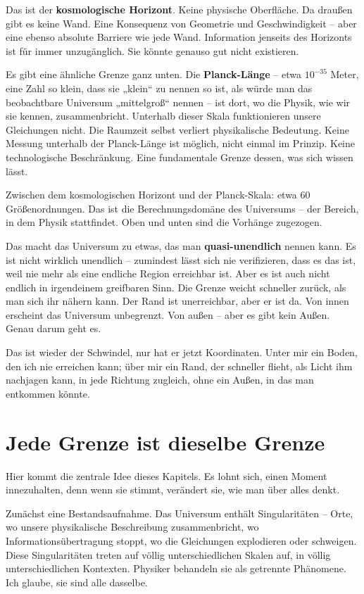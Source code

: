 \documentclass[11pt, twoside, openright]{book}
\begin{document}
Das ist der \textbf{kosmologische Horizont}. Keine physische Oberfläche. Da draußen gibt es keine Wand. Eine Konsequenz von Geometrie und Geschwindigkeit -- aber eine ebenso absolute Barriere wie jede Wand. Information jenseits des Horizonts ist für immer unzugänglich. Sie könnte genauso gut nicht existieren.

Es gibt eine ähnliche Grenze ganz unten. Die \textbf{Planck-Länge} -- etwa $10^{-35}$ Meter, eine Zahl so klein, dass sie „klein“ zu nennen so ist, als würde man das beobachtbare Universum „mittelgroß“ nennen -- ist dort, wo die Physik, wie wir sie kennen, zusammenbricht. Unterhalb dieser Skala funktionieren unsere Gleichungen nicht. Die Raumzeit selbst verliert physikalische Bedeutung. Keine Messung unterhalb der Planck-Länge ist möglich, nicht einmal im Prinzip. Keine technologische Beschränkung. Eine fundamentale Grenze dessen, was sich wissen lässt.

Zwischen dem kosmologischen Horizont und der Planck-Skala: etwa 60 Größenordnungen. Das ist die Berechnungsdomäne des Universums -- der Bereich, in dem Physik stattfindet. Oben und unten sind die Vorhänge zugezogen.

Das macht das Universum zu etwas, das man \textbf{quasi-unendlich} nennen kann. Es ist nicht wirklich unendlich -- zumindest lässt sich nie verifizieren, dass es das ist, weil nie mehr als eine endliche Region erreichbar ist. Aber es ist auch nicht endlich in irgendeinem greifbaren Sinn. Die Grenze weicht schneller zurück, als man sich ihr nähern kann. Der Rand ist unerreichbar, aber er ist da. Von innen erscheint das Universum unbegrenzt. Von außen -- aber es gibt kein Außen. Genau darum geht es.

Das ist wieder der Schwindel, nur hat er jetzt Koordinaten. Unter mir ein Boden, den ich nie erreichen kann; über mir ein Rand, der schneller flieht, als Licht ihm nachjagen kann, in jede Richtung zugleich, ohne ein Außen, in das man entkommen könnte.


\section*{Jede Grenze ist dieselbe Grenze}

Hier kommt die zentrale Idee dieses Kapitels. Es lohnt sich, einen Moment innezuhalten, denn wenn sie stimmt, verändert sie, wie man über alles denkt.

Zunächst eine Bestandsaufnahme. Das Universum enthält Singularitäten -- Orte, wo unsere physikalische Beschreibung zusammenbricht, wo Informationsübertragung stoppt, wo die Gleichungen explodieren oder schweigen. Diese Singularitäten treten auf völlig unterschiedlichen Skalen auf, in völlig unterschiedlichen Kontexten. Physiker behandeln sie als getrennte Phänomene. Ich glaube, sie sind alle dasselbe.
\end{document}
